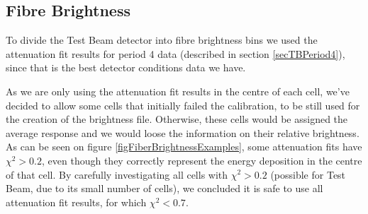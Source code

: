 \documentclass[12pt,a4paper]{article}
\begin{document}
\subsection{Fibre Brightness}

To divide the Test Beam detector into fibre brightness bins we used the attenuation fit results for period 4 data (described in section \ref{secTBPeriod4}), since that is the best detector conditions data we have. 

As we are only using the attenuation fit results in the centre of each cell, we've decided to allow some cells that initially failed the calibration, to be still used for the creation of the brightness file. Otherwise, these cells would be assigned the average response and we would loose the information on their relative brightness. As can be seen on figure \ref{figFiberBrightnessExamples}, some attenuation fits have $\chi^2>0.2$, even though they correctly represent the energy deposition in the centre of that cell. By carefully investigating all cells with $\chi^2>0.2$ (possible for Test Beam, due to its small number of cells), we concluded it is safe to use all attenuation fit results, for which $\chi^2<0.7$.

\end{document}
